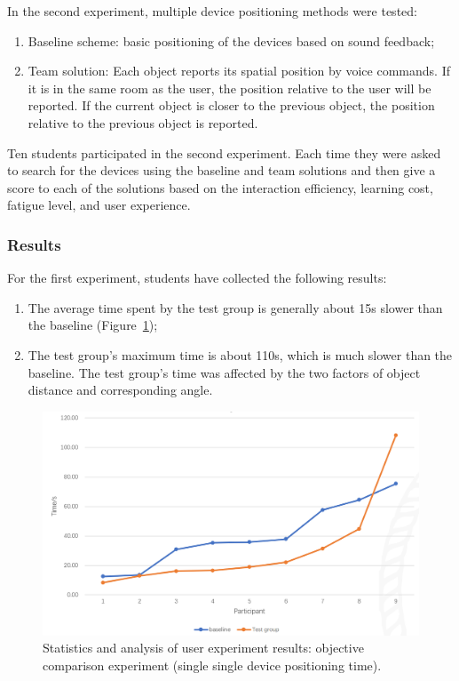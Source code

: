 In the second experiment, multiple device positioning methods were tested:
\begin{enumerate}
    \item Baseline scheme: basic positioning of the devices based on sound feedback;
    \item Team solution: Each object reports its spatial position by voice commands. If it is in the same room as the user, the position relative to the user will be reported. If the current object is closer to the previous object, the position relative to the previous object is reported. \end{enumerate}

Ten students participated in the second experiment. Each time they were asked to search for the devices using the baseline and team solutions and then give a score to each of the solutions based on the interaction efficiency, learning cost, fatigue level, and user experience. 

\subsubsection{Results}

For the first experiment, students have collected the following results:
\begin{enumerate}
    \item The average time spent by the test group is generally about 15s slower than the baseline (Figure~\ref{fig:Project1-figure});
    \item The test group's maximum time is about 110s, which is much slower than the baseline. The test group's time was affected by the two factors of object distance and corresponding angle.
\end{enumerate}

\begin{figure}
  \centering
  \includegraphics[width=0.9\linewidth]{figures/Project_1.png}
  \caption{Statistics and analysis of user experiment results: objective comparison experiment (single single device positioning time).}
  \label{fig:Project1-figure}
\end{figure}

